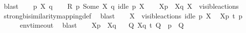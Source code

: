 \begin{isabellebody}
\ blast\isanewline
{}\isamarkupfalse%
\isanewline
\ \ \isamarkupfalse%
\ p\ X\ q\isanewline
\ \ \isamarkupfalse%
\ {\isacartoucheopen}{\isacharquery}{\kern0pt}R\ p\ {\isacharparenleft}{\kern0pt}Some\ X{\isacharparenright}{\kern0pt}\ q{\isacartoucheclose}\ {\isacartoucheopen}idle\ p\ X{\isacartoucheclose}\isanewline
\ \ \isamarkupfalse%
\ {\isacartoucheopen}{\isasymtheta}{\isacharbrackleft}{\kern0pt}X{\isacharbrackright}{\kern0pt}{\isacharparenleft}{\kern0pt}p{\isacharparenright}{\kern0pt}\ {\isasymleftrightarrow}\ {\isasymtheta}{\isacharbrackleft}{\kern0pt}X{\isacharbrackright}{\kern0pt}{\isacharparenleft}{\kern0pt}q{\isacharparenright}{\kern0pt}{\isacartoucheclose}\ {\isacartoucheopen}X\ {\isasymsubseteq}\ visible{\isacharunderscore}{\kern0pt}actions{\isacartoucheclose}\ \isamarkupfalse%
\ strong{\isacharunderscore}{\kern0pt}bisimilarity{\isacharunderscore}{\kern0pt}mapping{\isacharunderscore}{\kern0pt}def\ \isamarkupfalse%
\ blast{\isacharplus}{\kern0pt}\isanewline
\ \ \isamarkupfalse%
\ {\isacartoucheopen}X\ {\isasymsubseteq}\ visible{\isacharunderscore}{\kern0pt}actions{\isacartoucheclose}\ {\isacartoucheopen}idle\ p\ X{\isacartoucheclose}\ \isamarkupfalse%
\ {\isacartoucheopen}{\isasymtheta}{\isacharbrackleft}{\kern0pt}X{\isacharbrackright}{\kern0pt}{\isacharparenleft}{\kern0pt}p{\isacharparenright}{\kern0pt}\ {\isasymlongmapsto}\isactrlsup {\isasymtheta}t{\isacharunderscore}{\kern0pt}{\isasymepsilon}\ {\isasymtheta}{\isacharparenleft}{\kern0pt}p{\isacharparenright}{\kern0pt}{\isacartoucheclose}\ \isanewline
\ \ \ \ \isamarkupfalse%
\ env{\isacharunderscore}{\kern0pt}timeout\ \isamarkupfalse%
\ blast\isanewline
\ \ \isamarkupfalse%
\ {\isacartoucheopen}{\isasymtheta}{\isacharbrackleft}{\kern0pt}X{\isacharbrackright}{\kern0pt}{\isacharparenleft}{\kern0pt}p{\isacharparenright}{\kern0pt}\ {\isasymleftrightarrow}\ {\isasymtheta}{\isacharbrackleft}{\kern0pt}X{\isacharbrackright}{\kern0pt}{\isacharparenleft}{\kern0pt}q{\isacharparenright}{\kern0pt}{\isacartoucheclose}\ \isamarkupfalse%
\ {\isacartoucheopen}{\isasymexists}\ Q{\isacharprime}{\kern0pt}{\isachardot}{\kern0pt}\ {\isasymtheta}{\isacharbrackleft}{\kern0pt}X{\isacharbrackright}{\kern0pt}{\isacharparenleft}{\kern0pt}q{\isacharparenright}{\kern0pt}\ {\isasymlongmapsto}\isactrlsup {\isasymtheta}t{\isacharunderscore}{\kern0pt}{\isasymepsilon}\ Q{\isacharprime}{\kern0pt}\ {\isasymand}\ {\isasymtheta}{\isacharparenleft}{\kern0pt}p{\isacharparenright}{\kern0pt}\ {\isasymleftrightarrow}\ Q{\isacharprime}{\kern0pt}{\isacartoucheclose}\isanewline

\end{isabellebody}
